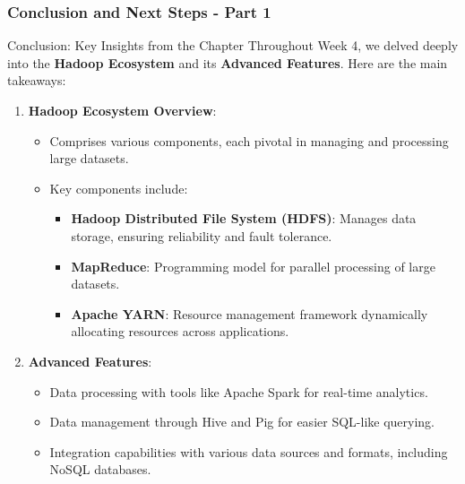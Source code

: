 \documentclass[aspectratio=169]{beamer}
\begin{document}
\begin{frame}[fragile]
    \frametitle{Conclusion and Next Steps - Part 1}
    
    \begin{block}{Conclusion: Key Insights from the Chapter}
    Throughout Week 4, we delved deeply into the \textbf{Hadoop Ecosystem} and its \textbf{Advanced Features}. Here are the main takeaways:
    \end{block}

    \begin{enumerate}
        \item \textbf{Hadoop Ecosystem Overview}:
        \begin{itemize}
            \item Comprises various components, each pivotal in managing and processing large datasets.
            \item Key components include:
            \begin{itemize}
                \item \textbf{Hadoop Distributed File System (HDFS)}: Manages data storage, ensuring reliability and fault tolerance.
                \item \textbf{MapReduce}: Programming model for parallel processing of large datasets.
                \item \textbf{Apache YARN}: Resource management framework dynamically allocating resources across applications.
            \end{itemize}
        \end{itemize}

        \item \textbf{Advanced Features}:
        \begin{itemize}
            \item Data processing with tools like Apache Spark for real-time analytics.
            \item Data management through Hive and Pig for easier SQL-like querying.
            \item Integration capabilities with various data sources and formats, including NoSQL databases.
        \end{itemize}
    \end{enumerate}
\end{frame}
\end{document}
